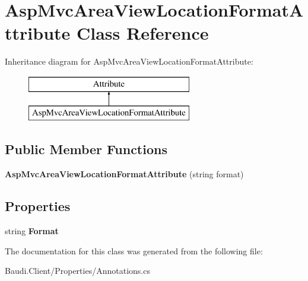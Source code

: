 \hypertarget{class_asp_mvc_area_view_location_format_attribute}{}\section{Asp\+Mvc\+Area\+View\+Location\+Format\+Attribute Class Reference}
\label{class_asp_mvc_area_view_location_format_attribute}
Inheritance diagram for Asp\+Mvc\+Area\+View\+Location\+Format\+Attribute\+:\begin{figure}[H]
\begin{center}
\leavevmode
\includegraphics[height=2.000000cm]{class_asp_mvc_area_view_location_format_attribute}
\end{center}
\end{figure}
\subsection*{Public Member Functions}
\begin{DoxyCompactItemize}
\item 
\hypertarget{class_asp_mvc_area_view_location_format_attribute_a27bac0c5e55099e7d35be1f54f361a44}{}{\bfseries Asp\+Mvc\+Area\+View\+Location\+Format\+Attribute} (string format)\label{class_asp_mvc_area_view_location_format_attribute_a27bac0c5e55099e7d35be1f54f361a44}

\end{DoxyCompactItemize}
\subsection*{Properties}
\begin{DoxyCompactItemize}
\item 
\hypertarget{class_asp_mvc_area_view_location_format_attribute_ac3d03e8d1371c427048f84046c327e0e}{}string {\bfseries Format}\label{class_asp_mvc_area_view_location_format_attribute_ac3d03e8d1371c427048f84046c327e0e}

\end{DoxyCompactItemize}


The documentation for this class was generated from the following file\+:\begin{DoxyCompactItemize}
\item 
Baudi.\+Client/\+Properties/Annotations.\+cs\end{DoxyCompactItemize}
